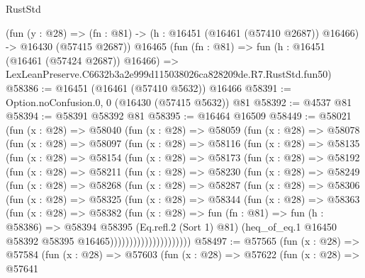 \begin{lexlean}{RustStd}
\begin{coremodule}
    (fun (y : @28) =>
    (fn : @81) -> (h : @16451 (@16461 (@57410 @2687)) @16466) -> @16430 (@57415 @2687))
    @16465
    (fun (fn : @81) =>
    fun (h : @16451 (@16461 (@57424 @2687)) @16466) =>
    LexLeanPreserve.C6632b3a2e999d115038026ca828209de.R7.RustStd.fun50)
@58386 := @16451 (@16461 (@57410 @5632)) @16466
@58391 := Option.noConfusion.{0, 0} (@16430 (@57415 @5632)) @81
@58392 := @4537 @81
@58394 := @58391 @58392 @81
@58395 := @16464 @16509
@58449 := @58021
    (fun (x : @28) =>
    @58040
      (fun (x : @28) =>
      @58059
        (fun (x : @28) =>
        @58078
          (fun (x : @28) =>
          @58097
            (fun (x : @28) =>
            @58116
              (fun (x : @28) =>
              @58135
                (fun (x : @28) =>
                @58154
                  (fun (x : @28) =>
                  @58173
                    (fun (x : @28) =>
                    @58192
                      (fun (x : @28) =>
                      @58211
                        (fun (x : @28) =>
                        @58230
                          (fun (x : @28) =>
                          @58249
                            (fun (x : @28) =>
                            @58268
                              (fun (x : @28) =>
                              @58287
                                (fun (x : @28) =>
                                @58306
                                  (fun (x : @28) =>
                                  @58325
                                    (fun (x : @28) =>
                                    @58344
                                      (fun (x : @28) =>
                                      @58363
                                        (fun (x : @28) =>
                                        @58382
                                          (fun (x : @28) =>
                                          fun (fn : @81) =>
                                          fun (h : @58386) =>
                                          @58394
                                            @58395
                                            (Eq.refl.{2} (Sort 1) @81)
                                            (heq_of_eq.{1}
                                              @16450
                                              @58392
                                              @58395
                                              @16465)))))))))))))))))))))
@58497 := @57565
    (fun (x : @28) =>
    @57584
      (fun (x : @28) =>
      @57603
        (fun (x : @28) =>
        @57622
          (fun (x : @28) =>
          @57641

\end{coremodule}
\end{lexlean}
